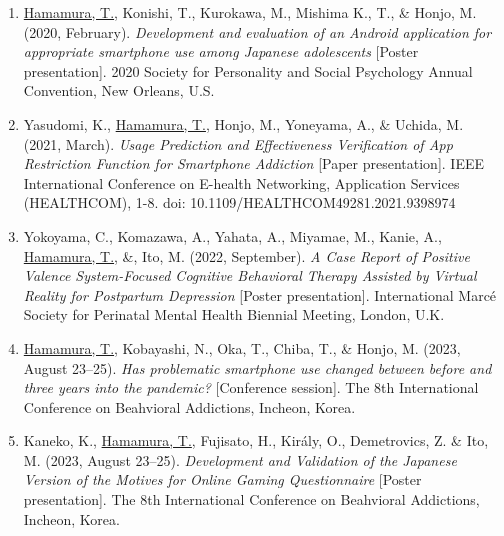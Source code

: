 \documentclass[11pt,a4paper]{article}
\begin{document}
\begin{enumerate}
	\item \underline{Hamamura, T.}, Konishi, T., Kurokawa, M., Mishima K., T., \& Honjo, M. (2020, February). \textit{Development and evaluation of an Android application for appropriate smartphone use among Japanese adolescents} [Poster presentation]. 2020 Society for Personality and Social Psychology Annual Convention, New Orleans, U.S.
	\item Yasudomi, K., \underline{Hamamura, T.}, Honjo, M., Yoneyama, A., \& Uchida, M. (2021, March). \textit{Usage Prediction and Effectiveness Verification of App Restriction Function for Smartphone Addiction} [Paper presentation]. IEEE International Conference on E-health Networking, Application Services (HEALTHCOM), 1-8. doi: 10.1109/HEALTHCOM49281.2021.9398974
	\item Yokoyama, C., Komazawa, A., Yahata, A., Miyamae, M., Kanie, A., \underline{Hamamura, T.}, \&, Ito, M. (2022, September). \textit{A Case Report of Positive Valence System-Focused Cognitive Behavioral Therapy Assisted by Virtual Reality for Postpartum Depression} [Poster presentation]. International Marc\'e Society for Perinatal Mental Health Biennial Meeting, London, U.K.
	\item \underline{Hamamura, T.}, Kobayashi, N., Oka, T., Chiba, T., \& Honjo, M. (2023, August 23--25). \textit{Has problematic smartphone use changed between before and three years into the pandemic?} [Conference session]. The 8th International Conference on Beahvioral Addictions, Incheon, Korea.
	\item Kaneko, K., \underline{Hamamura, T.}, Fujisato, H., Király, O., Demetrovics, Z. \& Ito, M. (2023, August 23--25). \textit{Development and Validation of the Japanese Version of the Motives for Online Gaming Questionnaire} [Poster presentation]. The 8th International Conference on Beahvioral Addictions, Incheon, Korea.
\end{enumerate}
\end{document}
